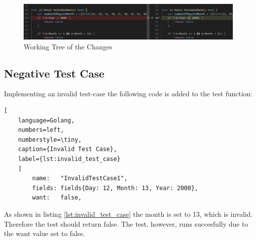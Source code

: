 \begin{figure}[H]
    \centering
    \includegraphics[width=\textwidth]{figures/goLang/carRental/carRental_dateTestWorkingTree.png}
    \caption{Working Tree of the Changes}
    \label{fig:car_rental_test_working_tree}
\end{figure}

\subsection*{Negative Test Case}
Implementing an invalid test-case the following code is added to the test function:
\begin{lstlisting}[
    language=Golang,
    numbers=left,
    numberstyle=\tiny,
    caption={Invalid Test Case},
    label={lst:invalid_test_case}
    ]
	    name:   "InvalidTestCase1",
        fields: fields{Day: 12, Month: 13, Year: 2000},
	    want:   false,  
\end{lstlisting}

As shown in listing \ref{lst:invalid_test_case} the month is set to 13, which is invalid.
Therefore the test should return false.
The test, however, runs succesfully due to the want value set to false.
